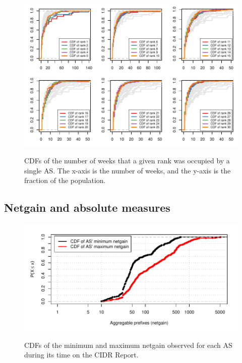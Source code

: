 \begin{figure}[H]
\begin{centering}
    \includegraphics[width=6in]{figures/cr_rank_cdfs.pdf}
    \vspace{-2em}\\
    \caption{CDFs of the number of weeks that a given rank was occupied by a single AS. The x-axis is the number of weeks, and the y-axis is the fraction of the population. }
\end{centering}
\end{figure}

\subsection{Netgain and absolute measures}

\begin{figure}[H]
\begin{centering}
    \includegraphics[width=6in]{figures/acr_netgain_cdfs.pdf}
    \vspace{-2em}\\
    \caption{CDFs of the minimum and maximum netgain observed for each AS during its time on the CIDR Report.}
\end{centering}
\end{figure}

